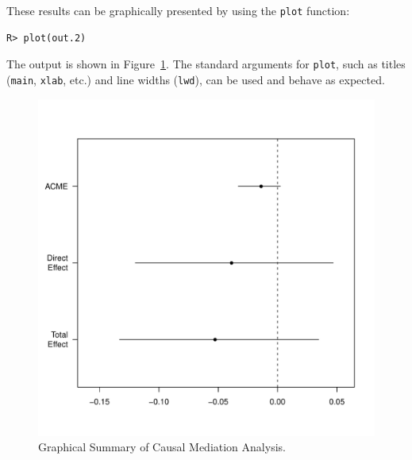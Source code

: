 \documentclass[11pt,letterpaper]{article}
\theoremstyle{plain}
\begin{document}
These results can be graphically presented by using the {\tt plot} function:
\begin{verbatim}
R> plot(out.2)
\end{verbatim}
The output is shown in Figure~\ref{fig:plot.mediate}. The standard arguments
for {\tt plot}, such as titles ({\tt main}, {\tt xlab}, etc.) and line widths 
({\tt lwd}), can be used and behave as expected.

\begin{figure}[t]
\vspace{-.5in}
\begin{center}
\includegraphics[scale=.8]{plot-mediate.pdf}
\end{center}
\vspace{-.5in}
\caption{Graphical Summary of Causal Mediation Analysis.
  \label{fig:plot.mediate}}
\end{figure}
\end{document}
